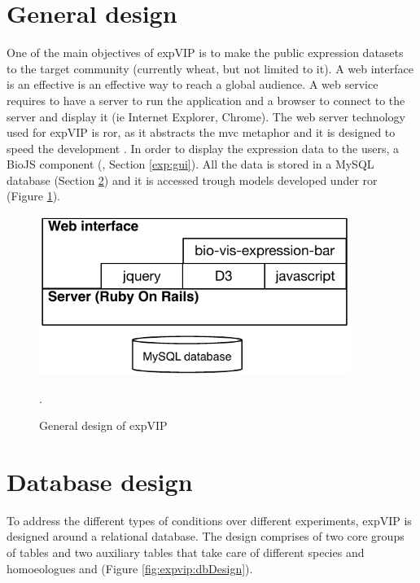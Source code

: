 \section{General design}

One of the main objectives of expVIP is to make the public expression datasets to the target community (currently wheat, but not limited to it). 
A web interface is an effective is an effective way to reach a global audience. 
A web service requires to have a server to run the application and a browser to connect to the server and display it (ie Internet Explorer, Chrome).
The web server technology used for expVIP is \acrshort{ror}, as it abstracts the \acrshort{mvc} metaphor and it is designed to speed the development \citep{RailsGuide2016}. 
In order to display the expression data to the users, a BioJS component (\citealt{Yachdav2015}, Section \ref{exp:gui}). 
All the data is stored in a MySQL database (Section \ref{exp:DB}) and it is accessed trough models developed under  \acrshort{ror} (Figure \ref{fig:poly:archDesign}).  

\begin{figure} 
  \centering
  \includegraphics[width=0.9\textwidth]{expVIP/Figures/archDesign.pdf}
  \caption{General design of expVIP}.
  \label{fig:poly:archDesign}
\end{figure}

\section{Database design} 
\label{exp:DB}

To address the different types of conditions over different experiments, expVIP is designed around a relational database. 
The design comprises of two core groups of tables and two auxiliary tables that take care of different species and  homoeologues and (Figure \ref{fig:expvip:dbDesign}).


